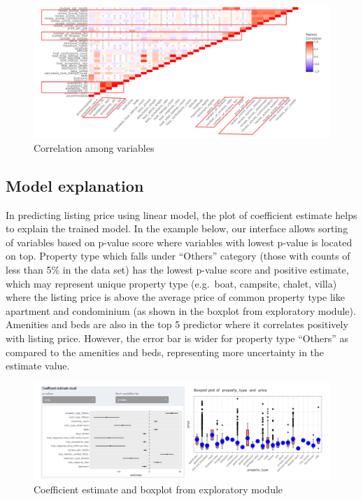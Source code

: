 \documentclass{acm_proc_article-sp}
\begin{document}
\begin{figure}[H]

{\centering \includegraphics[width=1\linewidth]{images/corrcase} 

}

\caption{Correlation among variables}\label{fig:unnamed-chunk-20}
\end{figure}

\hypertarget{model-explanation}{%
\subsection{Model explanation}\label{model-explanation}}

In predicting listing price using linear model, the plot of coefficient
estimate helps to explain the trained model. In the example below, our
interface allows sorting of variables based on p-value score where
variables with lowest p-value is located on top. Property type which
falls under ``Others'' category (those with counts of less than 5\% in
the data set) has the lowest p-value score and positive estimate, which
may represent unique property type (e.g.~boat, campsite, chalet, villa)
where the listing price is above the average price of common property
type like apartment and condominium (as shown in the boxplot from
exploratory module). Amenities and beds are also in the top 5 predictor
where it correlates positively with listing price. However, the error
bar is wider for property type ``Others'' as compared to the amenities
and beds, representing more uncertainty in the estimate value.

\begin{figure}[H]

{\centering \includegraphics[width=1\linewidth]{images/LMcoeff} 

}

\caption{Coefficient estimate and boxplot from exploratory module}\label{fig:unnamed-chunk-21}
\end{figure}
\end{document}
